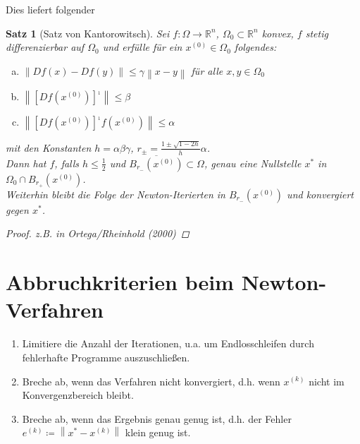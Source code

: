 \documentclass[ngerman,fontsize=11pt, paper=a4, parskip=half, titlepage=true, toc=bib]{scrbook}
\theoremstyle{definition}
\theoremstyle{plain}
\newtheorem*{satz}{Satz}
\newcommand{\Ren}{\mathds{R}^{n}}
\newcommand{\nn}[1]{\left\| #1 \right\|}
\newcommand{\sectione}[1]{ \setcounter{equation}{0}\section{#1}}
\begin{document}
Dies liefert folgender
\begin{satz}[Satz von Kantorowitsch]
Sei $f:\Omega\rightarrow \Ren$, $\Omega_0 \subset \Ren$ konvex,
$f$ stetig differenzierbar auf $\Omega_0$ und 
erfülle für ein $x^{(0)}\in \Omega_0$ folgendes:
\begin{enumerate}[a)]
\item $\nn{Df(x) -Df(y)}\leq \gamma \nn{x-y}$ für alle $x,y\in \Omega_0$
\item $\nn{[Df(x^{(0)})]^{_1}} \leq \beta$
\item $\nn{[Df(x^{(0)})]^{_1}f(x^{(0)})} \leq \alpha$
\end{enumerate}
mit den Konstanten $h=\alpha\beta\gamma$, $r_\pm = \frac{1\pm \sqrt{1-2h}}{h}\alpha$.\\
Dann hat $f$, falls $h\leq \frac{1}{2}$ und $\overline{B_{r_{-}}(x^{(0)})}\subset \Omega$,
genau eine Nullstelle $x^{*}$ in $\Omega_0\cap B_{r_+}(x^{(0)})$.\\
Weiterhin bleibt die Folge der Newton-Iterierten in $B_{r_{-}}(x^{(0)})$
und konvergiert gegen $x^{*}$.
\begin{proof}
  z.B. in Ortega/Rheinhold (2000)
\end{proof}
\end{satz}


\sectione{Abbruchkriterien beim Newton-Verfahren}
\begin{enumerate}[1)]
\item Limitiere die Anzahl der Iterationen, u.a. um 
  Endlosschleifen durch fehlerhafte Programme auszuschließen.
\item Breche ab, wenn das Verfahren nicht konvergiert, d.h.
  wenn $x^{(k)}$ nicht im Konvergenzbereich bleibt.
\item Breche ab, wenn das Ergebnis genau genug ist, d.h. der
  Fehler $e^{(k)}\coloneqq \nn{x^{*}-x^{(k)}}$ klein genug ist.
\end{enumerate}
\end{document}
